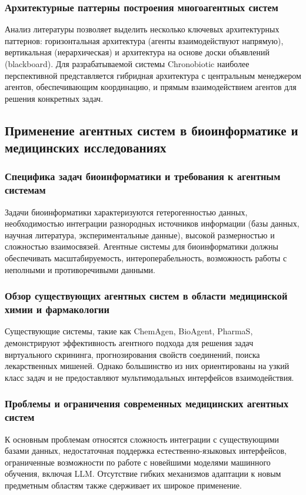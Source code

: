 \documentclass[a4paper,14pt]{extarticle}
\begin{document}
	\subsubsection{Архитектурные паттерны построения многоагентных систем}
	Анализ литературы позволяет выделить несколько ключевых архитектурных паттернов: горизонтальная архитектура (агенты взаимодействуют напрямую), вертикальная (иерархическая) и архитектура на основе доски объявлений (blackboard). Для разрабатываемой системы Chronobiotic наиболее перспективной представляется гибридная архитектура с центральным менеджером агентов, обеспечивающим координацию, и прямым взаимодействием агентов для решения конкретных задач.
	
	\subsection{Применение агентных систем в биоинформатике и медицинских исследованиях}
	
	\subsubsection{Специфика задач биоинформатики и требования к агентным системам}
	Задачи биоинформатики характеризуются гетерогенностью данных, необходимостью интеграции разнородных источников информации (базы данных, научная литература, экспериментальные данные), высокой размерностью и сложностью взаимосвязей. Агентные системы для биоинформатики должны обеспечивать масштабируемость, интероперабельность, возможность работы с неполными и противоречивыми данными.
	
	\subsubsection{Обзор существующих агентных систем в области медицинской химии и фармакологии}
	Существующие системы, такие как ChemAgen, BioAgent, PharmaS, демонстрируют эффективность агентного подхода для решения задач виртуального скрининга, прогнозирования свойств соединений, поиска лекарственных мишеней. Однако большинство из них ориентированы на узкий класс задач и не предоставляют мультимодальных интерфейсов взаимодействия.
	
	\subsubsection{Проблемы и ограничения современных медицинских агентных систем}
	К основным проблемам относятся сложность интеграции с существующими базами данных, недостаточная поддержка естественно-языковых интерфейсов, ограниченные возможности по работе с новейшими моделями машинного обучения, включая LLM. Отсутствие гибких механизмов адаптации к новым предметным областям также сдерживает их широкое применение.
	
\end{document}
